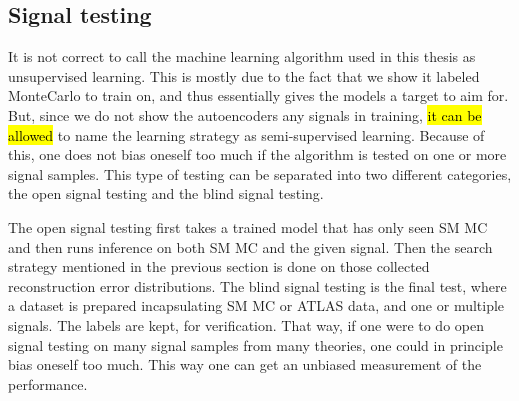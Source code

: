 \subsection*{Signal testing}
It is not correct to call the machine learning algorithm used in this thesis as unsupervised learning. 
This is mostly due to the fact that we show it labeled MonteCarlo to train on, and thus essentially gives 
the models a target to aim for. But, since we do not show the autoencoders any signals in training, \hl{it can be allowed} to 
name the learning strategy as semi-supervised learning. Because of this, one does not bias oneself too much 
if the algorithm is tested on one or more signal samples. This type of testing can be separated into two
different categories, the open signal testing and the blind signal testing. \par 
The open signal testing first takes a trained model that has only seen SM MC and then runs inference on both 
SM MC and the given signal. Then the search strategy mentioned in the previous section is done on those 
collected reconstruction error distributions. The blind signal testing is the final test, where a dataset 
is prepared incapsulating SM MC or ATLAS data, and one or multiple signals. The labels are kept, for verification. 
That way, if one were to do open signal testing on many signal samples from many theories, one could 
in principle bias oneself too much. This way one can get an unbiased measurement of the performance. 